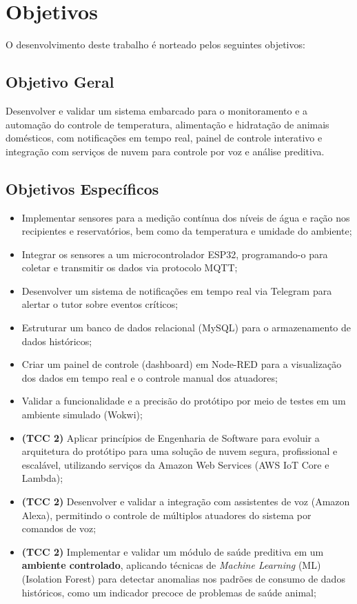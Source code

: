 \section{Objetivos}
O desenvolvimento deste trabalho é norteado pelos seguintes objetivos:

\subsection{Objetivo Geral}
Desenvolver e validar um sistema embarcado para o monitoramento e a automação do controle de temperatura, alimentação e hidratação de animais domésticos, com notificações em tempo real, painel de controle interativo e integração com serviços de nuvem para controle por voz e análise preditiva.
\subsection{Objetivos Específicos}
\begin{itemize}
    \item Implementar sensores para a medição contínua dos níveis de água e ração nos recipientes e reservatórios, bem como da temperatura e umidade do ambiente;
\item Integrar os sensores a um microcontrolador ESP32, programando-o para coletar e transmitir os dados via protocolo MQTT;
\item Desenvolver um sistema de notificações em tempo real via Telegram para alertar o tutor sobre eventos críticos;
\item Estruturar um banco de dados relacional (MySQL) para o armazenamento de dados históricos;
\item Criar um painel de controle (dashboard) em Node-RED para a visualização dos dados em tempo real e o controle manual dos atuadores;
\item Validar a funcionalidade e a precisão do protótipo por meio de testes em um ambiente simulado (Wokwi);
    \item \textbf{(TCC 2)} Aplicar princípios de Engenharia de Software para evoluir a arquitetura do protótipo para uma solução de nuvem segura, profissional e escalável, utilizando serviços da Amazon Web Services (AWS IoT Core e Lambda);
\item \textbf{(TCC 2)} Desenvolver e validar a integração com assistentes de voz (Amazon Alexa), permitindo o controle de múltiplos atuadores do sistema por comandos de voz;
\item \textbf{(TCC 2)} Implementar e validar um módulo de saúde preditiva em um \textbf{ambiente controlado}, aplicando técnicas de \textit{Machine Learning} (ML) (Isolation Forest) para detectar anomalias nos padrões de consumo de dados históricos, como um indicador precoce de problemas de saúde animal;
\end{itemize}

